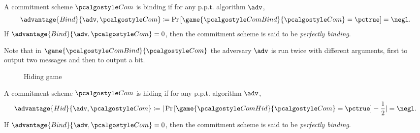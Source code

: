 \begin{definition}[Binding]
  A commitment scheme $\algo{Com}$ is binding if for any p.p.t. algorithm $\adv$,
 \[
  \advantage{Bind}{\adv, \algo{Com}} \defeq \pr{\game{\algo{ComBind}}{\algo{Com}} = \pctrue} = \negl.
 \]
 If $\advantage{Bind}{\adv, \algo{Com}} = 0$, then the commitment scheme is said to be \emph{perfectly binding}.
\end{definition}

Note that in $\game{\algo{ComBind}}{\algo{Com}}$ the adversary $\adv$ is run twice with different arguments, first to output two messages and then to output a bit.

\begin{figure}[tbhp]
  \begin{center}
    \begin{tcolorbox}[width=8cm]
      \begin{pchstack}[center]
      \end{pchstack}
    \end{tcolorbox}
  \end{center}
  \caption{Hiding game \label{fig:break-com-hid}}
\end{figure}

\begin{definition}[Hiding]
  A commitment scheme $\algo{Com}$ is hiding if for any p.p.t. algorithm $\adv$,
 \[
  \advantage{Hid}{\adv, \algo{Com}} \defeq |\pr{\game{\algo{ComHid}}{\algo{Com}} = \pctrue} - \frac{1}{2}| = \negl.
 \]
 If $\advantage{Bind}{\adv, \algo{Com}} = 0$, then the commitment scheme is said to be \emph{perfectly binding}.
\end{definition}

